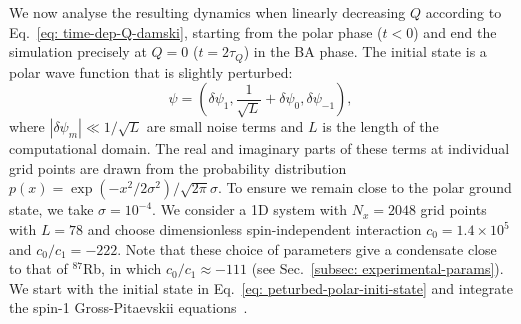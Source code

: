 We now analyse the resulting dynamics when linearly decreasing \( Q \) according
to Eq.~\eqref{eq: time-dep-Q-damski}, starting from the polar phase (\(t < 0\))
and end the simulation precisely at \( Q = 0 \) (\( t=2\tau_Q \)) in the BA
phase.
The initial state is a polar wave function that is slightly perturbed:
\begin{equation}
    \psi = \left(\delta\psi_1, \frac{1}{\sqrt{L}} + \delta\psi_0,
    \delta\psi_{-1}\right),
    \label{eq: peturbed-polar-initi-state}
\end{equation}
where \( |\delta\psi_m| \ll 1 / \sqrt{L} \) are small noise terms and \( L \) is
the length of the computational domain.
The real and imaginary parts of these terms at individual grid points are drawn
from the probability distribution
\( p(x) = \exp(-x^2/2\sigma^2)/\sqrt{2\pi}\sigma \).
To ensure we remain close to the polar ground state, we take
\( \sigma=10^{-4} \).
We consider a 1D system with \(N_x = 2048\) grid points with \(L=78\) and
choose dimensionless spin-independent interaction \(c_0=1.4\times10^5\) and
\(c_0/c_1 = -222\).
Note that these choice of parameters give a condensate close to that of
\(^{87}\)Rb, in which \(c_0/c_1 \approx -111\) (see
Sec.~\ref{subsec: experimental-params}).
We start with the initial state in Eq.~\eqref{eq: peturbed-polar-initi-state}
and integrate the spin-1 Gross-Pitaevskii equations~\cite{Symes2016}.

